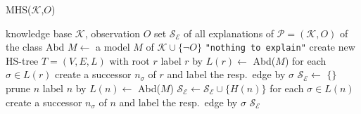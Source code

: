 \documentclass[12pt,a4paper]{article}
\begin{document}
\begin{algorithm}[H] 
	\footnotesize
	\caption{MHS($\mathcal{K}$,$O$)} \label{alg:mhs}
	\label{alg:SOA}
	\begin{algorithmic}[1]
		\Require knowledge base $\mathcal{K}$, observation $O$
		\Ensure set $\mathcal{S}_{\mathcal{E}}$ of all explanations of $\mathcal{P}=(\mathcal{K},O)$ of the class Abd
		\State $M \gets$ a model $M$ of $\mathcal{K} \cup \{\neg O\}$
		\label{soal:ta_init}
		\State \Return \texttt{"nothing to explain"} %
		\label{soal:nte}
		\EndIf %
		\label{soal:init:e}
		\State create new HS-tree $T=(V,E,L)$ with root $r$ %
		\label{soal:root:b}
		\State label $r$ by $L(r) \gets$ Abd($M$)
		\label{soal:r-label}
		\State for each $\sigma\in L(r)$ create a successor $n_\sigma$ of $r$
		and label the resp.\ edge by $\sigma$ %
		\label{soal:root:e}
		\State $\mathcal{S}_{\mathcal{E}} \gets$ $\{\}$ %
		\label{soal:SE:init}
		\label{soal:loop:b}
		\label{soal:prune:b}
		\State prune $n$
		\label{soal:prune:e}
		\label{soal:ta}
		\State label $n$ by $L(n) \gets$  Abd($M$) 
		\Else %
		\State $\mathcal{S}_\mathcal{E} \gets \mathcal{S}_\mathcal{E} \cup \{H(n)\}$ 
		\EndIf
		\State for each $\sigma\in L(n)$ create a successor $n_\sigma$ of $n$
		and label the resp.\ edge by $\sigma$ %
		\label{soal:modproc:e}
		\EndWhile
		\label{soal:loop:e}
		\label{soal:output}
		\State \Return $\mathcal{S}_\mathcal{E}$
	\end{algorithmic}
\end{algorithm}
\end{document}
